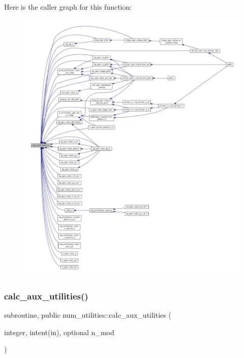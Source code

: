 Here is the caller graph for this function\+:
\nopagebreak
\begin{figure}[H]
\begin{center}
\leavevmode
\includegraphics[width=350pt]{namespacenum__utilities_a5ee3fbd1fe67d0deefc7194631389f2a_icgraph}
\end{center}
\end{figure}
\mbox{\label{namespacenum__utilities_af461ae4c95a7a45da875dcf311e323f5}} 
\subsubsection{\texorpdfstring{calc\+\_\+aux\+\_\+utilities()}{calc\_aux\_utilities()}}
{\footnotesize\ttfamily subroutine, public num\+\_\+utilities\+::calc\+\_\+aux\+\_\+utilities (\begin{DoxyParamCaption}\item[{integer, intent(in), optional}]{n\+\_\+mod }\end{DoxyParamCaption})}



